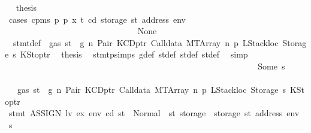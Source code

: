 \begin{isabellebody}
\ \isamarkupfalse%
\ {\isacharquery}{\kern0pt}thesis\isanewline
\ \ \ \ \ \ \ \ \ \ \ \ \ \ \ \ \ \ \ \ \ \ \ \ \ \ \ \ \isamarkupfalse%
\ {\isacharparenleft}{\kern0pt}cases\ {\isachardoublequoteopen}cpm{}s\ p\ p{\isacharprime}{\kern0pt}\ x\ t\ cd\ {\isacharparenleft}{\kern0pt}storage\ st{\isacharprime}{\kern0pt}{\isacharprime}{\kern0pt}\ {\isacharparenleft}{\kern0pt}address\ env{\isacharparenright}{\kern0pt}{\isacharparenright}{\kern0pt}{\isachardoublequoteclose}{\isacharparenright}{\kern0pt}\isanewline
\ \ \ \ \ \ \ \ \ \ \ \ \ \ \ \ \ \ \ \ \ \ \ \ \ \ \ \ \ \ \isamarkupfalse%
\ None\isanewline
\ \ \ \ \ \ \ \ \ \ \ \ \ \ \ \ \ \ \ \ \ \ \ \ \ \ \ \ \ \ \isamarkupfalse%
\ {}{\isacharparenleft}{\kern0pt}{}{\isacharparenright}{\kern0pt}\ stmt{\isacharunderscore}{\kern0pt}def\ {\isacharbackquoteopen}{\isasymnot}\ gas\ st\ {\isasymle}\ g{\isacharbackquoteclose}\ n\ Pair\ KCDptr\ Calldata\ MTArray\ n{}\ p{}\ LStackloc\ Storage\ s{}\ KStoptr\ \isamarkupfalse%
\ {\isacharquery}{\kern0pt}thesis\ \isamarkupfalse%
\ stmt{\isachardot}{\kern0pt}psimps{\isacharparenleft}{\kern0pt}{}{\isacharparenright}{\kern0pt}\ g{\isacharunderscore}{\kern0pt}def\ st{\isacharprime}{\kern0pt}{\isacharunderscore}{\kern0pt}def\ st{\isacharprime}{\kern0pt}{\isacharprime}{\kern0pt}{\isacharunderscore}{\kern0pt}def\ st{\isacharprime}{\kern0pt}{\isacharprime}{\kern0pt}{\isacharprime}{\kern0pt}{\isacharunderscore}{\kern0pt}def\ \isamarkupfalse%
\ simp\isanewline
\ \ \ \ \ \ \ \ \ \ \ \ \ \ \ \ \ \ \ \ \ \ \ \ \ \ \ \ \isamarkupfalse%
\isanewline
\ \ \ \ \ \ \ \ \ \ \ \ \ \ \ \ \ \ \ \ \ \ \ \ \ \ \ \ \ \ \isamarkupfalse%
\ {\isacharparenleft}{\kern0pt}Some\ s{\isacharprime}{\kern0pt}{\isacharparenright}{\kern0pt}\isanewline
\ \ \ \ \ \ \ \ \ \ \ \ \ \ \ \ \ \ \ \ \ \ \ \ \ \ \ \ \ \ \isamarkupfalse%
\ {}{\isacharparenleft}{\kern0pt}{}{\isacharparenright}{\kern0pt}\ {\isacharbackquoteopen}{\isasymnot}\ gas\ st\ {\isasymle}\ g{\isacharbackquoteclose}\ n\ Pair\ KCDptr\ Calldata\ MTArray\ n{}\ p{}\ LStackloc\ Storage\ s{}\ KStoptr\isanewline
\ \ \ \ \ \ \ \ \ \ \ \ \ \ \ \ \ \ \ \ \ \ \ \ \ \ \ \ \ \ \isamarkupfalse%
\ {\isachardoublequoteopen}stmt\ {\isacharparenleft}{\kern0pt}ASSIGN\ lv\ ex{\isacharparenright}{\kern0pt}\ env\ cd\ st\ {\isacharequal}{\kern0pt}\ Normal\ {\isacharparenleft}{\kern0pt}{\isacharparenleft}{\kern0pt}{\isacharparenright}{\kern0pt}{\isacharcomma}{\kern0pt}\ st{\isacharprime}{\kern0pt}{\isacharprime}{\kern0pt}{\isacharprime}{\kern0pt}\ {\isasymlparr}storage\ {\isacharcolon}{\kern0pt}{\isacharequal}{\kern0pt}\ {\isacharparenleft}{\kern0pt}storage\ st{\isacharprime}{\kern0pt}{\isacharprime}{\kern0pt}{\isacharparenright}{\kern0pt}\ {\isacharparenleft}{\kern0pt}address\ env\ {\isacharcolon}{\kern0pt}{\isacharequal}{\kern0pt}\ s{\isacharprime}{\kern0pt}{\isacharparenright}{\kern0pt}{\isasymrparr}{\isacharparenright}{\kern0pt}{\isachardoublequoteclose}\isanewline

\end{isabellebody}
